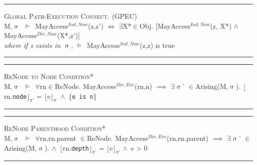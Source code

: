 \documentclass[a4paper,11pt, twoside,twocolumn]{article}
\newenvironment{logic}[1][]
{\begin{flushleft} \small }
{\end{flushleft}}
\newcommand{\loin}{$\in$}
\newcommand{\loforall}{$\forall$}
\newcommand{\loexists}{$\exists$}
\newcommand{\loand}{$\land$}
\newcommand{\loimplies}{$\implies$}
\newcommand{\losigma}{$\upsigma$}
\newcommand{\loturns} {$\vDash$}
\newcommand{\loiff} {$\iff$}
\newcommand{\loexec}[2] {$\lfloor$#1$\rfloor _{\text{#2}}$}
\newcommand{\ablock} {\null\qquad}
\begin{document}
\begin{logic}
\hrule\null
\textsc{\normalsize *Global Path-Execution Connect. (GPEC)}\\
M,\losigma\ \loturns\ MayAccess$^{Ind,Now}$(z,z')\linebreak
\ablock \loiff\linebreak
\ablock \loexists X*\loin{Obj}. $[$MayAccess$^{Ind,Now}$(z, X*) \loand\linebreak
\ablock \ablock \ablock \quad MayAccess$^{Dir,Now}$(X*,z')$]$
\\
\ablock \textit{where if z exists in \losigma,} \linebreak
\ablock \loturns\ MayAccess$^{Ind,Now}$(z,z) is true
\linebreak \\
\hrule
\end{logic}


\begin{logic} 
\hrule\null
\textsc{\normalsize *ReNode to Node Condition*}\\
M,\losigma\ \loturns\ \loforall rn\loin ReNode. MayAccess$^{Dir,Eve}$(rn,n)\linebreak
\ablock \loimplies \linebreak
\ablock \loexists \losigma' \loin Arising(M,\losigma).\linebreak
\ablock \ablock \loexec{rn.\texttt{node}}{\losigma'} = \loexec{e}{\losigma'} \loand\ \{\texttt{e is n}\}\linebreak
\hrule
\end{logic}

\begin{logic} 
\hrule\null
\textsc{\normalsize *ReNode Parenthood Condition*}\\
M,\losigma\ \loturns\ \loforall rn,rn.parent \loin ReNode. MayAccess$^{Dir,Eve}$(rn,rn.parent)\linebreak
\ablock \loimplies \linebreak
\ablock \loexists \losigma' \loin Arising(M,\losigma).\linebreak
\ablock \loand\ \loexec{rn.\texttt{depth}}{\losigma'} = \loexec{e}{\losigma'} \loand\ e > 0\linebreak
\hrule
\end{logic}
\end{document}
